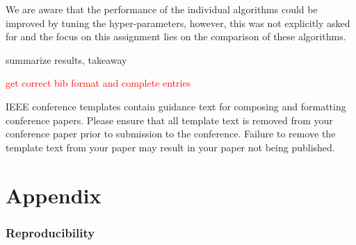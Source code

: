 \documentclass[conference]{IEEEtran}
\begin{document}
We are aware that the performance of the individual algorithms could be improved by tuning the hyper-parameters, however, this was not explicitly asked for and the focus on this assignment lies on the comparison of these algorithms.

summarize results, takeaway




\textcolor{red}{get correct bib format and complete entries}






\color{red}
\vspace{12pt}
IEEE conference templates contain guidance text for composing and formatting conference papers. Please ensure that all template text is removed from your conference paper prior to submission to the conference. Failure to remove the template text from your paper may result in your paper not being published.

\color{black}




\section{Appendix}


\subsubsection{Reproducibility}\label{sec:reproducibility}
\end{document}
